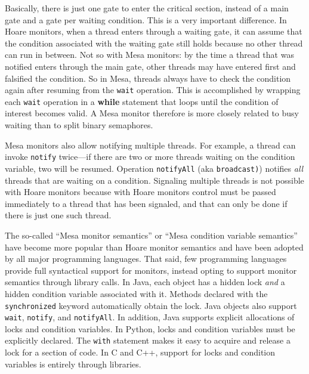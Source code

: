 \documentclass{report}
\begin{document}
Basically, there is just one gate to enter the critical section, instead
of a main gate and a gate per waiting condition.
This is a very important difference.  In Hoare monitors, when a thread
enters through a waiting gate, it can assume that the condition associated
with the waiting gate still holds because no other thread can run in between.
Not so with Mesa monitors: by the time a thread that was notified enters
through the main gate, other threads may have entered first and falsified
the condition.  So in Mesa, threads always have to check the condition
again after resuming from the \texttt{wait} operation.  This is accomplished
by wrapping each \texttt{wait} operation in a \textbf{while} statement that
loops until the condition of interest becomes valid.
A Mesa monitor therefore is more closely related to busy waiting
than to split binary semaphores.

Mesa monitors also allow notifying multiple threads.
For example, a thread can invoke \texttt{notify} twice---if there are
two or more threads waiting on the condition variable, two will be resumed.
Operation \texttt{notifyAll}
%
(aka \texttt{broadcast)})
%
notifies \emph{all} threads that are waiting
on a condition.
Signaling multiple threads is not possible with Hoare monitors because with
Hoare monitors control
must be passed immediately to a thread that has been signaled, and that
can only be done if there is just one such thread.

The so-called
``Mesa monitor semantics'' or ``Mesa condition variable semantics''
have become more popular than Hoare monitor semantics and have been
adopted by all major programming languages.
That said, few programming languages provide full syntactical support
for monitors, instead opting to support monitor semantics through library
calls.
In Java, each object has a hidden lock \emph{and} a hidden condition variable
associated with it.
Methods declared with the \texttt{synchronized} keyword automatically
obtain the lock.  Java objects also support \texttt{wait}, \texttt{notify},
and \texttt{notifyAll}.
In addition, Java supports explicit allocations of locks
and condition variables.
In Python, locks and condition variables must be explicitly declared.
The \texttt{with} statement makes it easy to acquire and release a lock
for a section of code.
In C and C++, support for locks and condition variables is entirely
through libraries.

\end{document}
